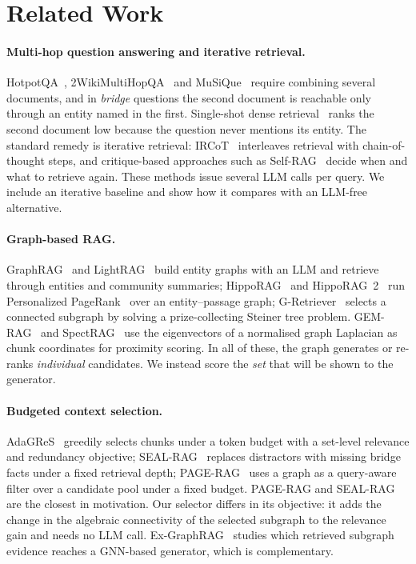 \section{Related Work}
\label{sec:related}

\paragraph{Multi-hop question answering and iterative retrieval.}
HotpotQA~\cite{yang2018hotpotqa}, 2WikiMultiHopQA~\cite{ho2020constructing} and MuSiQue~\cite{trivedi2022musique} require combining several documents, and in \emph{bridge} questions the second document is reachable only through an entity named in the first. Single-shot dense retrieval~\cite{karpukhin2020dpr,lewis2020rag} ranks the second document low because the question never mentions its entity. The standard remedy is iterative retrieval: IRCoT~\cite{trivedi2023ircot} interleaves retrieval with chain-of-thought steps, and critique-based approaches such as Self-RAG~\cite{asai2024selfrag} decide when and what to retrieve again. These methods issue several LLM calls per query. We include an iterative baseline and show how it compares with an LLM-free alternative.

\paragraph{Graph-based RAG.}
GraphRAG~\cite{edge2024graphrag} and LightRAG~\cite{guo2024lightrag} build entity graphs with an LLM and retrieve through entities and community summaries; HippoRAG~\cite{gutierrez2024hipporag} and HippoRAG~2~\cite{gutierrez2025hipporag2} run Personalized PageRank~\cite{haveliwala2002ppr} over an entity--passage graph; G-Retriever~\cite{he2024gretriever} selects a connected subgraph by solving a prize-collecting Steiner tree problem. GEM-RAG~\cite{rappazzo2024gem} and SpectRAG~\cite{spectrag} use the eigenvectors of a normalised graph Laplacian as chunk coordinates for proximity scoring. In all of these, the graph generates or re-ranks \emph{individual} candidates. We instead score the \emph{set} that will be shown to the generator.

\paragraph{Budgeted context selection.}
AdaGReS~\cite{peng2025adagres} greedily selects chunks under a token budget with a set-level relevance and redundancy objective; SEAL-RAG~\cite{lahmy2025seal} replaces distractors with missing bridge facts under a fixed retrieval depth; PAGE-RAG~\cite{deng2026page} uses a graph as a query-aware filter over a candidate pool under a fixed budget. PAGE-RAG and SEAL-RAG are the closest in motivation. Our selector differs in its objective: it adds the change in the algebraic connectivity of the selected subgraph to the relevance gain and needs no LLM call. Ex-GraphRAG~\cite{sade2026exgraphrag} studies which retrieved subgraph evidence reaches a GNN-based generator, which is complementary.

